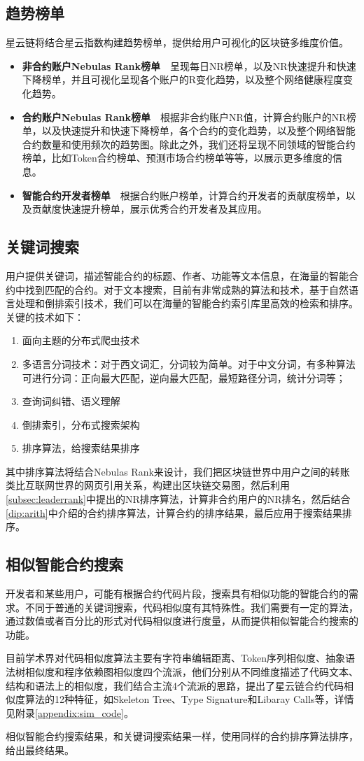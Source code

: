 \subsection{趋势榜单}
星云链将结合星云指数构建趋势榜单，提供给用户可视化的区块链多维度价值。
\begin{itemize}
\item \textbf{非合约账户Nebulas Rank榜单}~~呈现每日NR榜单，以及NR快速提升和快速下降榜单，并且可视化呈现各个账户的R变化趋势，以及整个网络健康程度变化趋势。
\item \textbf{合约账户Nebulas Rank榜单}~~根据非合约账户NR值，计算合约账户的NR榜单，以及快速提升和快速下降榜单，各个合约的变化趋势，以及整个网络智能合约数量和使用频次的趋势图。除此之外，我们还将呈现不同领域的智能合约榜单，比如Token合约榜单、预测市场合约榜单等等，以展示更多维度的信息。
\item \textbf{智能合约开发者榜单}~~根据合约账户榜单，计算合约开发者的贡献度榜单，以及贡献度快速提升榜单，展示优秀合约开发者及其应用。
\end{itemize}

\subsection{关键词搜索}
用户提供关键词，描述智能合约的标题、作者、功能等文本信息，在海量的智能合约中找到匹配的合约。对于文本搜索，目前有非常成熟的算法和技术，基于自然语言处理和倒排索引技术，我们可以在海量的智能合约索引库里高效的检索和排序。关键的技术如下：

\begin{enumerate}
	\item 面向主题的分布式爬虫技术
	\item 多语言分词技术：对于西文词汇，分词较为简单。对于中文分词，有多种算法可进行分词：正向最大匹配，逆向最大匹配，最短路径分词，统计分词等；
	\item 查询词纠错、语义理解
	\item 倒排索引，分布式搜索架构
	\item 排序算法，给搜索结果排序
\end{enumerate}

其中排序算法将结合Nebulas Rank来设计，我们把区块链世界中用户之间的转账类比互联网世界的网页引用关系，构建出区块链交易图，然后利用\ref{subsec:leaderrank}中提出的NR排序算法，计算非合约用户的NR排名，然后结合\ref{dip:arith}中介绍的合约排序算法，计算合约的排序结果，最后应用于搜索结果排序。


\subsection{相似智能合约搜索}
开发者和某些用户，可能有根据合约代码片段，搜索具有相似功能的智能合约的需求。不同于普通的关键词搜索，代码相似度有其特殊性。我们需要有一定的算法，通过数值或者百分比的形式对代码相似度进行度量，从而提供相似智能合约搜索的功能。

目前学术界对代码相似度算法主要有字符串编辑距离、Token序列相似度、抽象语法树相似度和程序依赖图相似度四个流派，他们分别从不同维度描述了代码文本、结构和语法上的相似度，我们结合主流4个流派的思路，提出了星云链合约代码相似度算法的12种特征，如Skeleton Tree、Type Signature和Libaray Calls等，详情见附录\ref{appendix:sim_code}。

相似智能合约搜索结果，和关键词搜索结果一样，使用同样的合约排序算法排序，给出最终结果。
